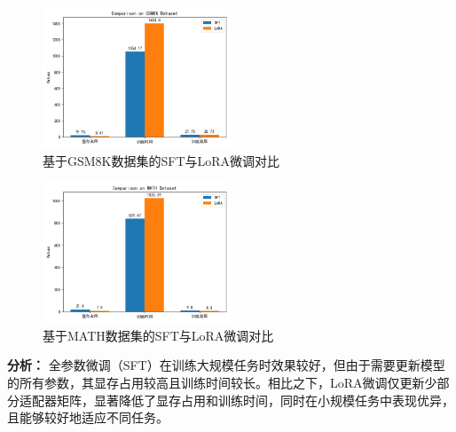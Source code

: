 \documentclass{article}
\begin{document}
\begin{figure}[H]
  \centering
  \includegraphics[width=0.5\textwidth]{GSM8K-LORA.png} %
  \caption{基于GSM8K数据集的SFT与LoRA微调对比} %
  \label{fig:my_label0} %
\end{figure}
\begin{figure}[H]
  \centering
  \includegraphics[width=0.5\textwidth]{MATH-LORA.png} %
  \caption{基于MATH数据集的SFT与LoRA微调对比} %
  \label{fig:my_label3} %
\end{figure}

\textbf{分析：}
全参数微调（SFT）在训练大规模任务时效果较好，但由于需要更新模型的所有参数，其显存占用较高且训练时间较长。相比之下，LoRA微调仅更新少部分适配器矩阵，显著降低了显存占用和训练时间，同时在小规模任务中表现优异，且能够较好地适应不同任务。
\end{document}

